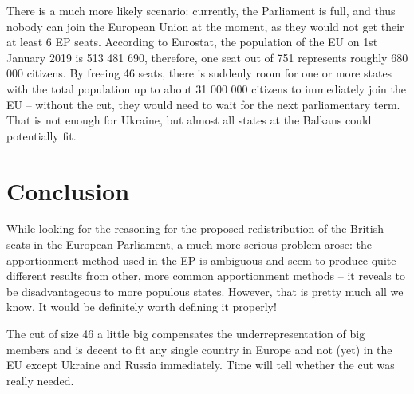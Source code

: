 \documentclass[a4paper]{article}
\theoremstyle{definition}
\begin{document}
There is a much more likely scenario: currently, the Parliament is full, and thus nobody can join the European Union at the moment, as they would not get their at least 6 EP seats. According to Eurostat, the population of the EU on 1st January 2019 is 513 481 690, therefore, one seat out of 751 represents roughly 680 000 citizens. By freeing 46 seats, there is suddenly room for one or more states with the total population up to about 31 000 000 citizens to immediately join the EU -- without the cut, they would need to wait for the next parliamentary term. That is not enough for Ukraine, but almost all states at the Balkans could potentially fit.

\section{Conclusion}

While looking for the reasoning for the proposed redistribution of the British seats in the European Parliament, a much more serious problem arose: the apportionment method used in the EP is ambiguous and seem to produce quite different results from other, more common apportionment methods -- it reveals to be disadvantageous to more populous states. However, that is pretty much all we know. It would be definitely worth defining it properly!

The cut of size 46 a little big compensates the underrepresentation of big members and is decent to fit any single country in Europe and not (yet) in the EU except Ukraine and Russia immediately. Time will tell whether the cut was really needed.
\end{document}
